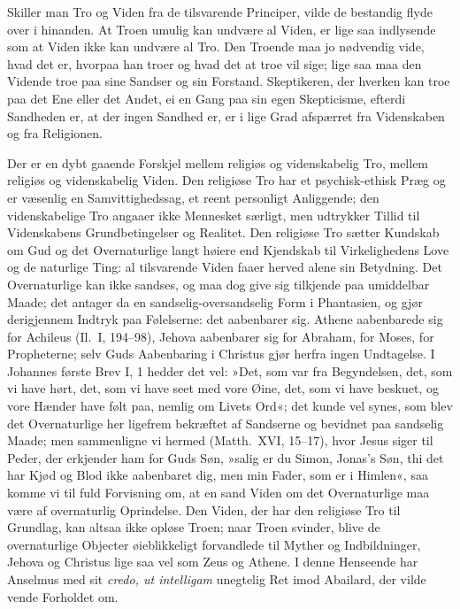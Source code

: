 \documentclass[12pt,a4paper]{article}
\begin{document}
Skiller man Tro og Viden fra de tilsvarende Principer, vilde de
bestandig flyde over i hinanden. At Troen umulig kan undvære al Viden,
er lige saa indlysende som at Viden ikke kan undvære al Tro. Den
Troende maa jo nødvendig vide, hvad det er, hvorpaa han troer og hvad
det at troe vil sige; lige saa maa den Vidende troe paa sine Sandser og
sin Forstand. Skeptikeren, der hverken kan troe paa det Ene eller det
Andet, ei en Gang paa sin egen Skepticisme, efterdi Sandheden er, at
der ingen Sandhed er, er i lige Grad afspærret fra Videnskaben og fra
Religionen.

Der er en dybt gaaende Forskjel mellem religiøs og videnskabelig Tro,
mellem religiøs og videnskabelig Viden. Den religiøse Tro har et
psychisk-ethisk Præg og er væsenlig en Samvittighedssag, et reent
personligt Anliggende; den videnskabelige Tro angaaer ikke Mennesket
særligt, men udtrykker Tillid til Videnskabens Grundbetingelser og
Realitet. Den religiøse Tro sætter Kundskab om Gud og det Overnaturlige
langt høiere end Kjendskab til Virkelighedens Love og de naturlige
Ting: al tilsvarende Viden faaer herved alene sin Betydning. Det
Overnaturlige kan ikke sandses, og maa dog give sig tilkjende paa
umiddelbar Maade; det antager da en sandselig-oversandselig Form i
Phantasien, og gjør derigjennem Indtryk paa Følelserne: det aabenbarer
sig. Athene aabenbarede sig for Achileus (Il.\ I, 194--98), Jehova
aabenbarer sig for Abraham, for Moses, for Propheterne; selv Guds
Aabenbaring i Christus gjør herfra ingen Undtagelse. I Johannes første
Brev I, 1 hedder det vel: »Det, som var fra Begyndelsen, det, som vi
have hørt, det, som vi have seet med vore Øine, det, som vi have
beskuet, og vore Hænder have følt paa, nemlig om Livets Ord«; det
kunde vel synes, som blev det Overnaturlige her ligefrem bekræftet af
Sandserne og bevidnet paa sandselig Maade; men sammenligne vi hermed
(Matth.\ XVI, 15--17), hvor Jesus siger til Peder, der erkjender ham
for Guds Søn, »salig er du Simon, Jonas's Søn, thi det har Kjød og
Blod ikke aabenbaret dig, men min Fader, som er i Himlen«, saa komme
vi til fuld Forvisning om, at en sand Viden om det Overnaturlige maa
være af overnaturlig Oprindelse. Den Viden, der har den religiøse Tro
til Grundlag, kan altsaa ikke opløse Troen; naar Troen svinder, blive
de overnaturlige Objecter øieblikkeligt forvandlede til Myther og
Indbildninger, Jehova og Christus lige saa vel som Zeus og Athene. I
denne Henseende har Anselmus med sit \emph{credo, ut intelligam}
unegtelig Ret imod Abailard, der vilde vende Forholdet om.
\end{document}
